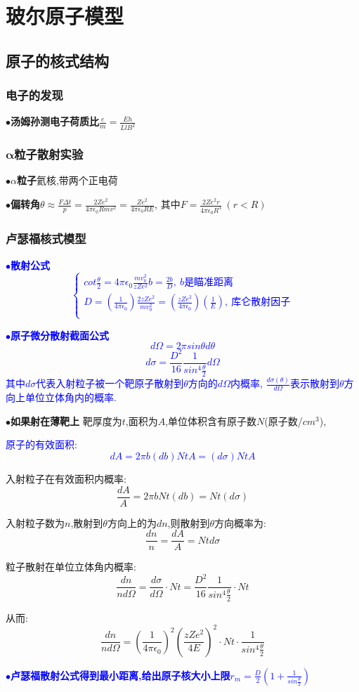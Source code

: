 \documentclass[UTF8]{article}
\newcommand{\keypoint}[2]{$\bullet$\textbf{#1}\quad#2\par}
\begin{document}
\section{玻尔原子模型}
\subsection{原子的核式结构}
\subsubsection{电子的发现}
\keypoint{汤姆孙测电子荷质比}{$\frac{e}{m}=\frac{Eh}{LlB^2}$}
\subsubsection{$\bm{\alpha}$粒子散射实验}
\keypoint{$\alpha$粒子}{氦核,带两个正电荷}
\keypoint{偏转角}{$\theta\approx\frac{F\Delta t}{p}=\frac{2Ze^2}{4\pi\epsilon_0Rmv^2}=\frac{Ze^2}{4\pi\epsilon_0RE}$, 其中$F=\frac{2Ze^2r}{4\pi\epsilon_0R^3}\ (r<R)$}
\subsubsection{卢瑟福核式模型}
\textcolor{blue}{\keypoint{散射公式}{
	$$ 
	\left\{
	\begin{array}{l}
	cot\frac{\theta}{2}=4\pi\epsilon_0\frac{mv_0^2}{zZe^2}b=\frac{2b}{D},\ b\mbox{是瞄准距离}\\
	D=\left(\frac{1}{4\pi\epsilon_0}\right)\frac{2zZe^2}{mv_0^2}=\left(\frac{zZe^2}{4\pi\epsilon_0}\right)\left(\frac{1}{E}\right),\ \mbox{库仑散射因子}\\
	\end{array}
	\right.
	$$
}}
\textcolor{blue}{\keypoint{原子微分散射截面公式}{
	$$d\Omega=2\pi sin\theta d\theta$$
	$$d\sigma=\frac{D^2}{16}\frac{1}{sin^4\frac{\theta}{2}}d\Omega$$
	其中$d\sigma$代表入射粒子被一个靶原子散射到$\theta$方向的$d\Omega$内概率, $\frac{d\sigma(\theta)}{d\Omega}$表示散射到$\theta$方向上单位立体角内的概率.
}}
\keypoint{如果射在薄靶上}{
	靶厚度为$t$,面积为$A$,单位体积含有原子数$N$(原子数/$cm^3$),\par
	\textcolor{blue}{原子的有效面积: 
	$$dA=2\pi b(db)NtA=(d\sigma)NtA$$}\par
	入射粒子在有效面积内概率: 
	$$\frac{dA}{A}=2\pi bNt(db)=Nt(d\sigma)$$\par
	入射粒子数为$n$,散射到$\theta$方向上的为$dn$,则散射到$\theta$方向概率为: 
	$$\frac{dn}{n}=\frac{dA}{A}=Ntd\sigma$$\par
	粒子散射在单位立体角内概率:
	$$\frac{dn}{nd\Omega}=\frac{d\sigma}{d\Omega}\cdot Nt=\frac{D^2}{16}\frac{1}{sin^4\frac{\theta}{2}}\cdot Nt$$\par
	从而:
	$$\frac{dn}{nd\Omega}=\left(\frac{1}{4\pi\epsilon_0}\right)^2\left(\frac{zZe^2}{4E}\right)^2\cdot Nt\cdot \frac{1}{sin^4\frac{\theta}{2}}$$\par
}
\textcolor{blue}{\keypoint{卢瑟福散射公式得到最小距离,给出原子核大小上限}{$r_m=\frac{D}{2}\left(1+\frac{1}{sin\frac{\theta}{2}}\right)$}}
\end{document}
